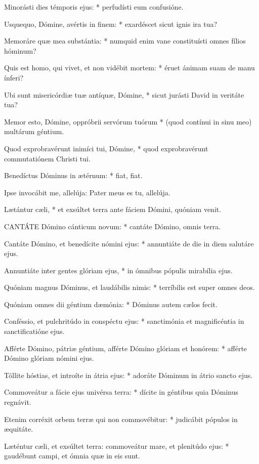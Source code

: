 Minorásti dies témporis ejus: * perfudísti eum confusióne.

Usquequo, Dómine, avértis in finem: * exardéscet sicut ignis ira tua?

Memoráre quæ mea substántia: * numquid enim vane constituísti omnes fílios hóminum?

Quis est homo, qui vivet, et non vidébit mortem: * éruet ánimam suam de manu ínferi?

Ubi sunt misericórdiæ tuæ antíquæ, Dómine, * sicut jurásti David in veritáte tua?

Memor esto, Dómine, oppróbrii servórum tuórum * (quod contínui in sinu meo) multárum géntium.

Quod exprobravérunt inimíci tui, Dómine, * quod exprobravérunt commutatiónem Christi tui.

Benedíctus Dóminus in ætérnum: * fiat, fiat.

 Ipse invocábit me, allelúja: Pater meus es tu, allelúja.

 Lætántur cæli, * et exsúltet terra ante fáciem Dómini, quóniam venit.


\lettrine[lines=2]{C}{ANTÁTE} Dómino cánticum novum: * cantáte Dómino, omnis terra.

Cantáte Dómino, et benedícite nómini ejus: * annuntiáte de die in diem salutáre ejus.

Annuntiáte inter gentes glóriam ejus, * in ómnibus pópulis mirabília ejus.

Quóniam magnus Dóminus, et laudábilis nimis: * terríbilis est super omnes deos.

Quóniam omnes dii géntium dæmónia: * Dóminus autem cælos fecit.

Conféssio, et pulchritúdo in conspéctu ejus: * sanctimónia et magnificéntia in sanctificatióne ejus.

Afférte Dómino, pátriæ géntium, afférte Dómino glóriam et honórem: * afférte Dómino glóriam nómini ejus.

Tóllite hóstias, et introíte in átria ejus: * adoráte Dóminum in átrio sancto ejus.

Commoveátur a fácie ejus univérsa terra: * dícite in géntibus quia Dóminus regnávit.

Etenim corréxit orbem terræ qui non commovébitur: * judicábit pópulos in æquitáte.

Læténtur cæli, et exsúltet terra: commoveátur mare, et plenitúdo ejus: * gaudébunt campi, et ómnia quæ in eis sunt.

